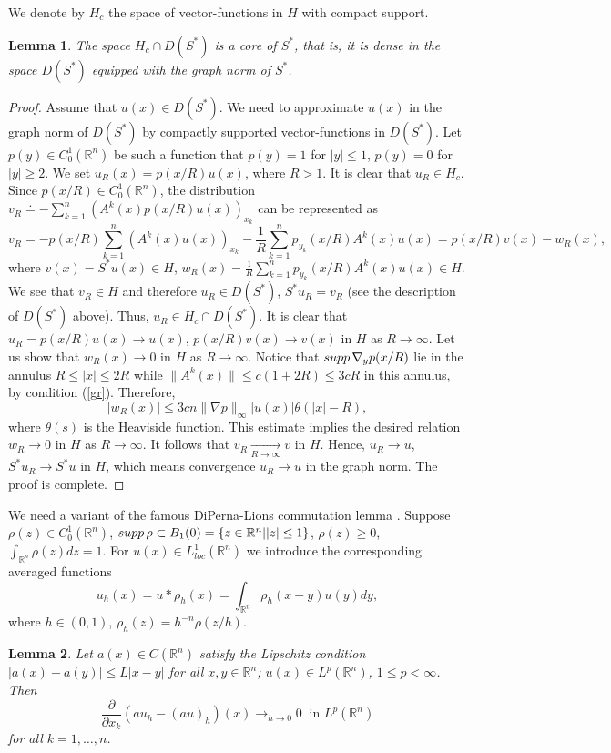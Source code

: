\documentclass[10pt,a4paper]{amsart}
\newtheorem{lemma}{Lemma}[section]
\numberwithin{equation}{section}
\newcommand{\R}{{\mathbb R}}
\newcommand{\supp}{\mathop{\rm supp}}
\begin{document}
We denote by $H_c$ the space of vector-functions in $H$ with compact support.

\begin{lemma}\label{lem1}
The space $H_c\cap D(S^*)$ is a core of $S^*$, that is, it is dense in the space $D(S^*)$ equipped with the graph norm of $S^*$.
\end{lemma}

\begin{proof}
Assume that $u(x)\in D(S^*)$. We need to approximate $u(x)$ in the graph norm of $D(S^*)$ by compactly supported vector-functions in $D(S^*)$. Let $p(y)\in C_0^1(\R^n)$ be such a function that $p(y)=1$ for $|y|\le 1$, $p(y)=0$ for $|y|\ge 2$. We set $u_R(x)=p(x/R)u(x)$, where $R>1$. It is clear that $u_R\in H_c$.
Since $p(x/R)\in C_0^1(\R^n)$, the distribution $\displaystyle v_R\doteq -\sum_{k=1}^n (A^k(x)p(x/R)u(x))_{x_k}$ can be represented as
\begin{equation}\label{4}
v_R=-p(x/R)\sum_{k=1}^n (A^k(x)u(x))_{x_k}-\frac{1}{R}\sum_{k=1}^n p_{y_k}(x/R)A^k(x)u(x)=p(x/R)v(x)-w_R(x),
\end{equation}
where $v(x)=S^*u(x)\in H$, $\displaystyle w_R(x)=\frac{1}{R}\sum_{k=1}^n p_{y_k}(x/R)A^k(x)u(x)\in H$. We see that $v_R\in H$ and therefore $u_R\in D(S^*)$, $S^*u_R=v_R$ (see the description of $D(S^*)$ above). Thus, $u_R\in H_c\cap D(S^*)$. It is clear that $u_R=p(x/R)u(x)\to u(x)$, $p(x/R)v(x)\to v(x)$ in $H$ as $R\to\infty$. Let us show that $w_R(x)\to 0$ in $H$
as $R\to\infty$. Notice that $\supp \nabla_y p(x/R)$ lie in the annulus $R\le |x|\le 2R$ while $\|A^k(x)\|\le c(1+2R)\le 3cR$ in this annulus, by condition (\ref{gr}). Therefore,
\[
|w_R(x)|\le 3cn\|\nabla p\|_\infty |u(x)|\theta(|x|-R),
\]
where $\theta(s)$ is the Heaviside function. This estimate implies the desired relation $w_R\to 0$ in $H$ as $R\to\infty$.
It follows that $v_R\mathop{\to}\limits_{R\to\infty} v$ in $H$. Hence, $u_R\to u$, $S^*u_R\to S^*u$ in $H$, which means
convergence $u_R\to u$ in the graph norm. The proof is complete.
\end{proof}

We need a variant of the famous DiPerna-Lions commutation lemma
\cite[Lemma~II.1]{DiL}. Suppose $\rho(z)\in C_0^1(\R^n)$, $\supp\rho\subset B_1(0)=\{z\in\R^n | |z|\le 1\}$, $\rho(z)\ge 0$, $\int_{\R^n}\rho(z)dz=1$. For $u(x)\in L^1_{loc}(\R^n)$ we introduce the corresponding averaged functions
\[u_h(x)=u*\rho_h(x)=\int_{\R^n}\rho_h(x-y)u(y)dy,\]
where $h\in (0,1)$, $\rho_h(z)=h^{-n}\rho(z/h)$.

\begin{lemma}\label{lmDL}
Let $a(x)\in C(\R^n)$ satisfy the Lipschitz condition
${|a(x)-a(y)|\le L|x-y|}$ for all $x,y\in\R^n$; $u(x)\in L^p(\R^n)$, $1\le p<\infty$. Then
\begin{equation}\label{DL}
\frac{\partial}{\partial x_k}(au_h-(au)_h)(x)\mathop{\to}_{h\to 0} 0 \ \mbox{ in } L^p(\R^n)
\end{equation}
for all $k=1,\ldots,n$.
\end{lemma}
\end{document}
